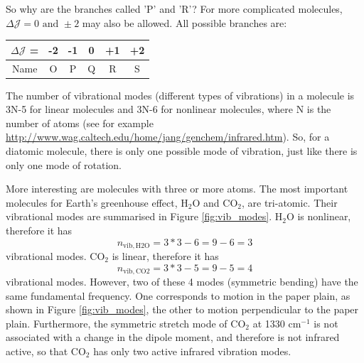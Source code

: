 So why are the branches called 'P' and 'R'? For more complicated molecules, $\Delta \mathcal{J} = 0 \text{ and } \pm 2$ may also be allowed. All possible branches are:


\begin{center}
\begin{tabular}{|c|c|c|c|c|c|} \hline
$\Delta\mathcal{J}$ = & -2 & -1 & 0 & +1 & +2 \\
\hline
Name & O & P & Q & R & S \\
\hline
\end{tabular}
\end{center}

The number of vibrational modes (different types of vibrations) in a
molecule is 3N-5 for linear molecules and 3N-6 for nonlinear
molecules, where N is the number of atoms (see for example
\url{http://www.wag.caltech.edu/home/jang/genchem/infrared.htm}). So,
for a diatomic molecule, there is only one possible mode of vibration,
just like there is only one mode of rotation.

More interesting are molecules with three or more atoms. The most
important molecules for Earth's greenhouse effect, 
H$_2$O and CO$_2$, are tri-atomic. Their vibrational modes are
summarised in Figure \ref{fig:vib_modes}. H$_2$O is nonlinear, therefore it has
\begin{equation}
  n_\mathrm{vib,H2O} = 3*3-6 = 9-6 = 3
\end{equation}
vibrational modes. CO$_2$ is linear, therefore it has
\begin{equation}
  n_\mathrm{vib,CO2} = 3*3-5 = 9-5 = 4
\end{equation}
vibrational modes. However, two of these 4 modes (symmetric bending)
have the same fundamental frequency. One corresponds to motion in the
paper plain, as shown in Figure \ref{fig:vib_modes}, the other to
motion perpendicular to the paper plain. Furthermore, the symmetric
stretch mode of CO$_2$ at 1330 cm$^{-1}$ is not associated with a
change in the dipole moment, and therefore is not infrared active, so
that CO$_2$ has only two active infrared vibration modes.

